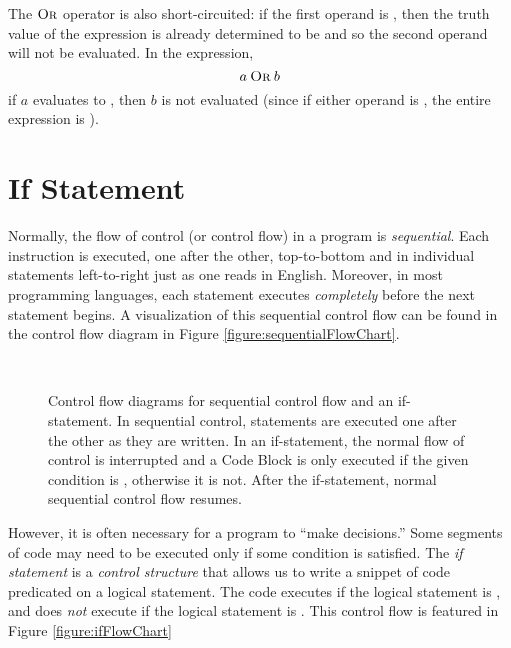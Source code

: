 The $\mathbin{\textsc{Or}}$ operator is also short-circuited: if the first operand is \True, then the 
truth value of the expression is already determined to be \True and so the second
operand will not be evaluated.  In the expression, 
  $$a \mathbin{\textsc{Or}} b$$
if $a$ evaluates to \True, then $b$ is not evaluated (since if either operand is \True, 
the entire expression is \True).

\section{If Statement}

Normally, the flow of control (or \gls{control flow}) in a program is \emph{sequential}.  
Each instruction is executed, one after the other, top-to-bottom and in individual
statements left-to-right just as one reads in English.  Moreover, in most programming 
languages, each statement executes \emph{completely} before the next statement
begins.  A visualization of this sequential control flow can be found in the control
flow diagram in Figure \ref{figure:sequentialFlowChart}.

\begin{figure}
\centering
{}
~~~~~~
\caption[Control flow diagrams for sequential control flow and an if-statement.]{Control 
flow diagrams for sequential control flow and an if-statement.  In
sequential control, statements are executed one after the other as they are written.
In an if-statement, the normal flow of control is interrupted and a Code Block is
only executed if the given condition is \True, otherwise it is not.  After the 
if-statement, normal sequential control flow resumes.}
\label{figures:sequentialAndIfStatement}
\end{figure}

%

However, it is often necessary for a program to ``make decisions.''  Some segments
of code may need to be executed only if some condition is satisfied.  The 
\emph{if statement} is a \emph{control structure} that allows us to write 
a snippet of code predicated on a logical statement.  The code executes if
the logical statement is \True, and does \emph{not} execute if the logical
statement is \False.  This control flow is featured in Figure \ref{figure:ifFlowChart}

